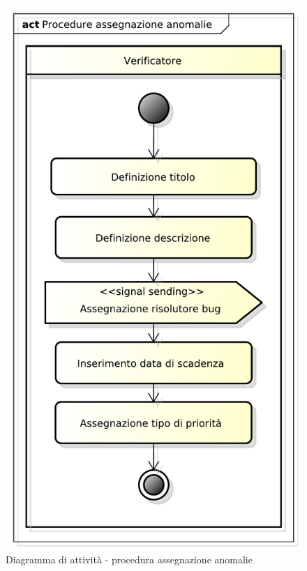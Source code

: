 			\begin{figure}[htbp]
				\centering
				\includegraphics[scale=0.5]{images/proc_assegnazione_anomalie.pdf}
				\caption{Diagramma di attività - procedura assegnazione anomalie}
				\label{fig:procedura_assegnazione_anomalie}
			\end{figure}


